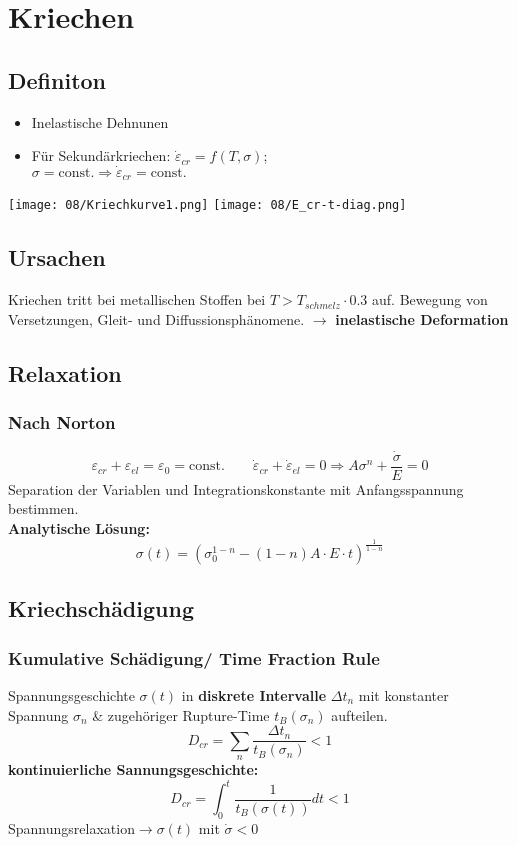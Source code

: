 \section{Kriechen}
    \subsection{Definiton}
        \begin{itemize}
            \item Inelastische Dehnunen
            \item Für Sekundärkriechen: $\dot{\varepsilon}_{cr} = f(T,\sigma)$;\\$\sigma = \textrm{const.} \Rightarrow \dot{\varepsilon}_{cr}= \textrm{const.}$
        \end{itemize}
        \texttt{[image: 08/Kriechkurve1.png]}
        \texttt{[image: 08/E\_cr-t-diag.png]}
    \subsection{Ursachen}
        Kriechen tritt bei metallischen Stoffen bei $ T > T_{schmelz} \cdot 0.3  $ auf.
        Bewegung von Versetzungen, Gleit- und Diffussionsphänomene. $\rightarrow$ \textbf{inelastische Deformation}
        
    \subsection{Relaxation}
        \subsubsection{Nach Norton}
            \[\varepsilon_{cr}+\varepsilon_{el}=\varepsilon_0=\textrm{const.} \qquad \dot{\varepsilon}_{cr}+\dot{\varepsilon}_{el}=0 \Rightarrow A\sigma^n + \frac{\dot{\sigma}}{E}=0\]
            Separation der Variablen und Integrationskonstante mit Anfangsspannung bestimmen.
            \\\textbf{Analytische Lösung:}
            \vspace{-2mm}\[\sigma(t)=\left(\sigma_{0}^{1-n}-(1-n)A\cdot E\cdot t\right)^{\frac{1}{1-n}}\]
    \subsection{Kriechschädigung}
        \subsubsection{Kumulative Schädigung/ Time Fraction Rule}
            Spannungsgeschichte $\sigma(t)$ in \textbf{diskrete Intervalle} $\Delta t_n$ mit konstanter Spannung $\sigma_n$ \& zugehöriger Rupture-Time $t_B(\sigma_n)$ aufteilen.
            \vspace{-2mm}\[D_{cr}=\sum_n\frac{\Delta t_{n}}{t_B(\sigma_n)} < 1\]
            \textbf{kontinuierliche Sannungsgeschichte:}
            \vspace{-2mm}\[D_{cr}=\int_0^t\frac{1}{t_B(\sigma(t))}dt < 1\]
            Spannungsrelaxation$\rightarrow \sigma(t)$ mit $\dot{\sigma}<0$
